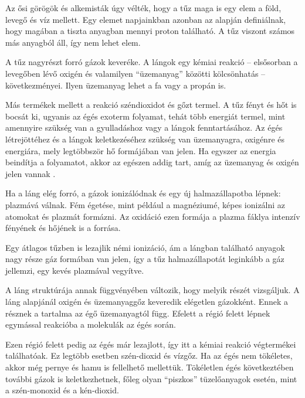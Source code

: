 

Az ősi görögök és alkemisták úgy vélték, hogy a tűz maga is egy elem a föld, levegő és víz mellett. Egy elemet napjainkban azonban az alapján definiálnak, hogy magában a tiszta anyagban mennyi proton található. A tűz viszont számos más anyagból áll, így nem lehet elem. 

A tűz nagyrészt forró gázok keveréke. A lángok egy kémiai reakció -- elsősorban a levegőben lévő oxigén és valamilyen ``üzemanyag'' közötti kölcsönhatás -- következményei. Ilyen üzemanyag lehet a fa vagy a propán is.

Más termékek mellett a reakció széndioxidot és gőzt termel. A tűz fényt és hőt is bocsát ki, ugyanis az égés exoterm folyamat, tehát több energiát termel, mint amennyire szükség van a gyulladáshoz vagy a lángok fenntartásához. Az égés létrejöttéhez és a lángok keletkezéséhez szükség van üzemanyagra, oxigénre és energiára, mely legtöbbször hő formájában van jelen. Ha egyszer az energia beindítja a folyamatot, akkor az egészen addig tart, amíg az üzemanyag és oxigén jelen vannak \cite{firePhysics2}.

Ha a láng elég forró, a gázok ionizálódnak és egy új halmazállapotba lépnek: plazmává válnak. Fém égetése, mint például a magnéziumé, képes ionizálni az atomokat és plazmát formázni. Az oxidáció ezen formája a plazma fáklya intenzív fényének és hőjének is a forrása.

Egy átlagos tűzben is lezajlik némi ionizáció, ám a lángban található anyagok nagy része gáz formában van jelen, így a tűz halmazállapotát leginkább a gáz jellemzi, egy kevés plazmával vegyítve.

A láng struktúrája annak függvényében változik, hogy melyik részét vizsgáljuk. A láng alapjánál oxigén és üzemanyaggőz keveredik elégetlen gázokként. Ennek a résznek a tartalma az égő üzemanyagtól függ. Efelett a régió felett lépnek egymással reakcióba a molekulák az égés során. 


Ezen régió felett pedig az égés már lezajlott, így itt a kémiai reakció végtermékei találhatóak. Ez legtöbb esetben szén-dioxid és vízgőz. Ha az égés nem tökéletes, akkor még pernye és hamu is fellelhető mellettük. Tökéletlen égés következtében további gázok is keletkezhetnek, főleg olyan ``piszkos'' tüzelőanyagok esetén, mint a szén-monoxid és a kén-dioxid.

